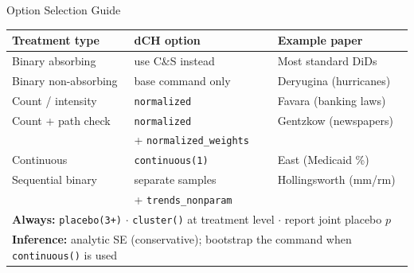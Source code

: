 \documentclass[main.tex]{subfiles}
\begin{document}
\begin{frame}{Option Selection Guide}

  \begin{tabular}{@{}lll@{}}
    \toprule
    \textbf{Treatment type} & \textbf{dCH option} & \textbf{Example paper} \\
    \midrule
    Binary absorbing    & use C\&S instead
                        & Most standard DiDs \\[3pt]
    Binary non-absorbing & base command only
                        & Deryugina (hurricanes) \\[3pt]
    Count / intensity   & \texttt{normalized}
                        & Favara (banking laws) \\[3pt]
    Count + path check  & \texttt{normalized}
                        & Gentzkow (newspapers) \\
                        & \quad+ \texttt{normalized\_weights} & \\[3pt]
    Continuous          & \texttt{continuous(1)}
                        & East (Medicaid \%) \\[3pt]
    Sequential binary   & separate samples
                        & Hollingsworth (mm/rm) \\
                        & \quad+ \texttt{trends\_nonparam} & \\[3pt]
    \midrule
    \multicolumn{3}{l}{\textbf{Always:}
      \texttt{placebo(3+)} $\cdot$
      \texttt{cluster()} at treatment level $\cdot$
      report joint placebo $p$} \\
    \multicolumn{3}{l}{\textbf{Inference:} analytic SE (conservative);
      bootstrap the command when \texttt{continuous()} is used} \\
    \bottomrule
  \end{tabular}

\end{frame}
\end{document}
